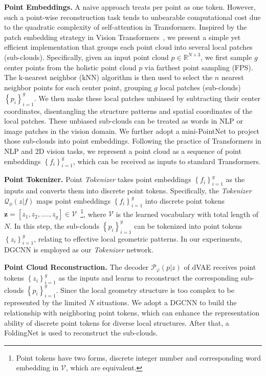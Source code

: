 \documentclass[10pt,twocolumn,letterpaper]{article}
\newcommand{\paragrapha}[2][5pt]{\vspace{#1}\noindent\textbf{#2}}
\begin{document}
\paragrapha{Point Embeddings.} 
A naive approach treats per point as one token. However, such a point-wise reconstruction task tends to unbearable computational cost due to the quadratic complexity of self-attention in Transformers. Inspired by the patch embedding strategy in Vision Transformers~\cite{vit}, we present a simple yet efficient implementation that groups each point cloud into several local patches (sub-clouds). Specifically, given an input point cloud $ p\in \mathbb{R}^{N\times 3}$, we first sample $g$ center points from the holistic point cloud $ p$ via farthest point sampling (FPS). The k-nearest neighbor (kNN) algorithm is then used to select the $n$ nearest neighbor points for each center point, grouping $g$ local patches (sub-clouds) $\left \{  p_{i} \right \}_{i=1}^{g}$.  We then make these local patches unbiased by subtracting their center coordinates, disentangling the structure patterns and spatial coordinates of the local patches. These unbiased sub-clouds can be treated as words in NLP or image patches in the vision domain. We further adopt a mini-PointNet\cite{pointnet} to project those sub-clouds into point embeddings. Following the practice of Transformers in NLP and 2D vision tasks, we represent a point cloud as a sequence of point embeddings $\left \{  f_{i} \right \}_{i=1}^{g}$, which can be received as inputs to standard Transformers.

\paragrapha{Point Tokenizer.}
Point \textit{Tokenizer}  takes point embeddings $\left \{  f_{i} \right \}_{i=1}^{g}$ as the inputs and converts them into discrete point tokens. Specifically, the \textit{Tokenizer} $\mathcal{Q}_{\phi}(z|f)$  maps point embeddings $\left \{  f_{i} \right \}_{i=1}^{g}$ into discrete point tokens $\mathbf{z}=[z_{1},z_{2},....,z_{g}] \in \mathcal{V} $~\footnote{Point tokens have two forms, discrete integer number and corresponding word embedding in $\mathcal{V}$, which are equivalent.}, where $\mathcal{V}$ is the learned vocabulary with total length of $N$. In this step, the sub-clouds  $\left \{  p_{i} \right \}_{i=1}^{g}$ can be tokenized into  point tokens $\left \{  z_{i} \right \}_{i=1}^{g}$, relating to  effective local geometric patterns. In our experiments, DGCNN\cite{wang2019dynamic} is employed as our \textit{Tokenizer} network.
	
\paragrapha{Point Cloud Reconstruction.}  The decoder  $\mathcal{P}_{\varphi }(p|z)$ of dVAE receives point tokens $\left \{  z_{i} \right \}_{i=1}^{g}$  as the inputs and learns to reconstruct the corresponding sub-clouds $\left \{  p_{i} \right \}_{i=1}^{g}$. Since the local geometry structure is too complex to be represented by the limited $N$ situations. We adopt a DGCNN\cite{wang2019dynamic} to build the relationship with neighboring point tokens, which can enhance the representation ability of discrete point tokens for diverse local structures. After that, a FoldingNet\cite{foldingnet} is used to reconstruct the sub-clouds.
	
\end{document}
